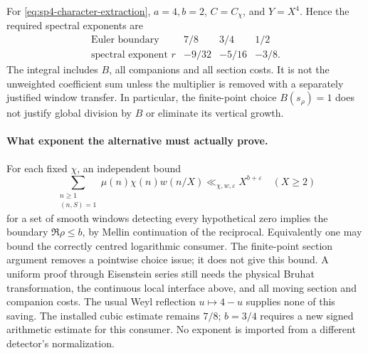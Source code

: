 For \eqref{eq:sp4-character-extraction}, \(a=4,b=2\),
\(C=C_\chi\), and \(Y=X^4\). Hence the required spectral exponents
are
\[
 \begin{array}{c|ccc}
 \text{Euler boundary}&7/8&3/4&1/2\\\hline
 \text{spectral exponent }r&-9/32&-5/16&-3/8.
 \end{array}
\]
The integral includes \(B\), all companions and all section costs.
It is not the unweighted coefficient sum unless the multiplier is
removed with a separately justified window transfer. In particular,
the finite-point choice \(B(s_\rho)=1\) does not justify global
division by \(B\) or eliminate its vertical growth.

\paragraph{What exponent the alternative must actually prove.}
For each fixed \(\chi\), an independent bound
\[
 \sum_{\substack{n\ge1\\(n,S)=1}}\mu(n)\chi(n)w(n/X)
       \ll_{\chi,w,\varepsilon}X^{b+\varepsilon}
 \quad(X\ge2)
\]
for a set of smooth windows detecting every hypothetical zero implies
the boundary \(\Re\rho\le b\), by Mellin continuation of the reciprocal.
Equivalently one may bound the correctly centred logarithmic consumer.
The finite-point section argument removes a pointwise choice issue;
it does not give this bound. A uniform proof through Eisenstein series
still needs the physical Bruhat transformation, the continuous local
interface above, and all moving section and companion costs.
The usual Weyl reflection \(u\mapsto4-u\) supplies none of this saving.
The installed cubic estimate remains \(7/8\); \(b=3/4\) requires a
new signed arithmetic estimate for this consumer. No exponent is
imported from a different detector's normalization.
